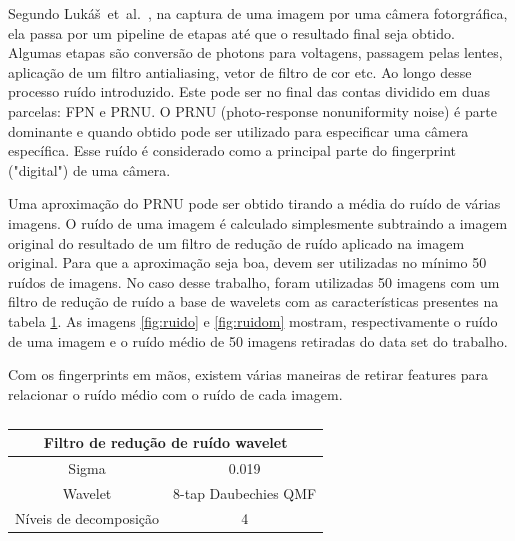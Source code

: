 \documentclass[10pt,twocolumn,letterpaper]{article}
\newcommand{\CITEN}[2]{\mbox{#1 et al. \cite{#2}}}
\begin{document}
Segundo \CITEN{Lukáš}{Lukas_2006}, na captura de uma imagem por uma câmera fotorgráfica, ela passa por um pipeline de etapas até que o resultado final seja obtido. Algumas etapas são conversão de photons para voltagens, passagem pelas lentes, aplicação de um filtro antialiasing, vetor de filtro de cor etc. Ao longo desse processo ruído introduzido. Este pode ser no final das contas dividido em duas parcelas: FPN e PRNU. O  PRNU (photo-response nonuniformity noise) é parte dominante e quando obtido pode ser utilizado para especificar uma câmera específica. Esse ruído é considerado como a principal parte do fingerprint ("digital") de uma câmera.

Uma aproximação do PRNU pode ser obtido tirando a média do ruído de várias imagens. O ruído de uma imagem é calculado simplesmente subtraindo a imagem original do resultado de um filtro de redução de ruído aplicado na imagem original. Para que a aproximação seja boa, devem ser utilizadas no mínimo 50 ruídos de imagens. No caso desse trabalho, foram utilizadas 50 imagens com um filtro de redução de ruído a base de wavelets com as características presentes na tabela \ref{tab:filtro}. As imagens \ref{fig:ruido} e \ref{fig:ruidom} mostram, respectivamente o ruído de uma imagem e o ruído médio de 50 imagens retiradas do data set do trabalho.

Com os fingerprints em mãos, existem várias maneiras de retirar features para relacionar o ruído médio com o ruído de cada imagem.

\begin{table}[]
\centering
\caption{}
\label{tab:filtro}
\begin{tabular}{|c|c|}
\hline
\multicolumn{2}{|c|}{Filtro de redução de ruído wavelet} \\ \hline
Sigma                        & 0.019                     \\ \hline
Wavelet                      & 8-tap Daubechies QMF      \\ \hline
Níveis de decomposição       & 4                         \\ \hline
\end{tabular}
\end{table}
\end{document}

